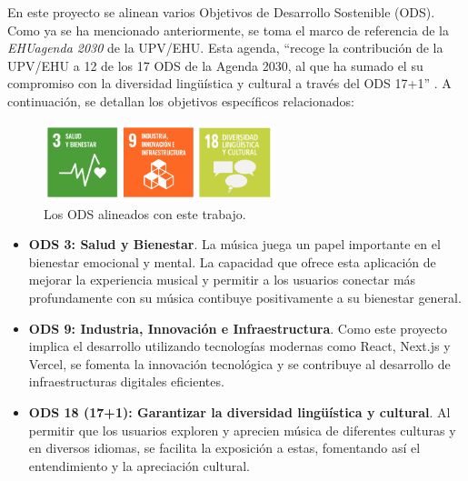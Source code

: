 En este proyecto se alinean varios Objetivos de Desarrollo Sostenible (ODS). Como ya se ha mencionado anteriormente, se toma el marco de referencia de la \textit{EHUagenda 2030} de la UPV/EHU. Esta agenda, ``recoge la contribución de la UPV/EHU a 12 de los 17 ODS de la Agenda 2030, al que ha sumado el su compromiso con la diversidad lingüística y cultural a través del ODS 17+1'' \cite{ehuagenda2030}. A continuación, se detallan los objetivos específicos relacionados:

\begin{figure}[h]
    \centering
    \includegraphics[width=0.6\textwidth]{figures/tres_ods_relacionadas.png}
    \caption{Los ODS alineados con este trabajo.}
    \label{fig:tres_ods}
\end{figure}

\begin{itemize}
    \item \textbf{ODS 3: Salud y Bienestar}. La música juega un papel importante en el bienestar emocional y mental. La capacidad que ofrece esta aplicación de mejorar la experiencia musical y permitir a los usuarios conectar más profundamente con su música contibuye positivamente a su bienestar general.
    \item \textbf{ODS 9: Industria, Innovación e Infraestructura}. Como este proyecto implica el desarrollo utilizando tecnologías modernas como React, Next.js y Vercel, se fomenta la innovación tecnológica y se contribuye al desarrollo de infraestructuras digitales eficientes.
    \item \textbf{ODS 18 (17+1): Garantizar la diversidad lingüística y cultural}. Al permitir que los usuarios exploren y aprecien música de diferentes culturas y en diversos idiomas, se facilita la exposición a estas, fomentando así el entendimiento y la apreciación cultural.
\end{itemize}